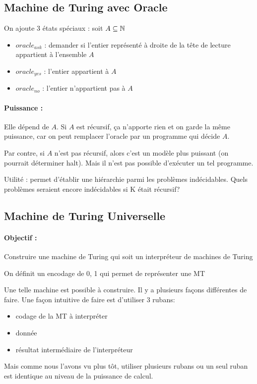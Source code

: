 \subsection{Machine de Turing avec Oracle}
On ajoute 3 états spéciaux : soit $A \subseteq \mathbb{N}$
\begin{itemize}
	\item $oracle_{ask}$ : demander si l'entier représenté à droite de la
		tête de lecture appartient à l'ensemble $A$
	\item $oracle_{yes}$ : l'entier appartient à $A$
	\item $oracle_{no}$ :  l'entier n'appartient pas à $A$
\end{itemize}

\paragraph{Puissance :} Elle dépend de $A$. Si $A$ est récursif, ça n'apporte rien et
  on garde la même puissance, car on peut remplacer l'oracle par un programme qui décide
  $A$.

Par contre, si $A$ n'est pas récursif, alors c'est un modèle plus
puissant (on pourrait déterminer halt). Mais il n’est pas possible d'exécuter un tel programme.

\begin{myrem}
	Utilité : permet d'établir une hiérarchie parmi les problèmes
	indécidables. Quels problèmes seraient encore
	indécidables si K était récursif?
\end{myrem}

\subsection{Machine de Turing Universelle}

\paragraph{Objectif :} Construire une machine de Turing qui soit un
interpréteur de machines de Turing

\begin{myrem}
	On définit un encodage de 0, 1 qui permet de représenter une MT
\end{myrem}

Une telle machine est possible à construire. Il y a plusieurs façons différentes de faire. Une façon intuitive de faire est d'utiliser 3 rubans:
\begin{itemize}
	\item codage de la MT à interpréter
	\item donnée
	\item résultat intermédiaire de l'interpréteur
\end{itemize}
Mais comme nous l'avons vu plus tôt, utiliser plusieurs rubans ou un seul ruban est identique au niveau de la puissance de calcul.

